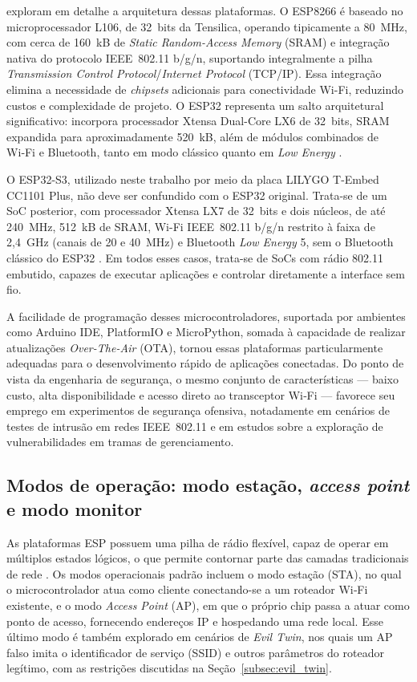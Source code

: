 exploram em detalhe a arquitetura dessas plataformas. O ESP8266 é baseado no microprocessador L106, de 32~bits da Tensilica, operando tipicamente a 80~MHz, com cerca de 160~kB de \textit{Static Random-Access Memory} (SRAM) e integração nativa do protocolo IEEE~802.11 b/g/n, suportando integralmente a pilha \textit{Transmission Control Protocol}/\textit{Internet Protocol} (TCP/IP). Essa integração elimina a necessidade de \textit{chipsets} adicionais para conectividade Wi-Fi, reduzindo custos e complexidade de projeto. O ESP32 representa um salto arquitetural significativo: incorpora processador Xtensa Dual-Core LX6 de 32~bits, SRAM expandida para aproximadamente 520~kB, além de módulos combinados de Wi‑Fi e Bluetooth, tanto em modo clássico quanto em \textit{Low Energy} \cite{LitayemAlsadi2023}.

O ESP32-S3, utilizado neste trabalho por meio da placa LILYGO T-Embed CC1101 Plus, não deve ser confundido com o ESP32 original. Trata-se de um SoC posterior, com processador Xtensa LX7 de 32~bits e dois núcleos, de até 240~MHz, 512~kB de SRAM, Wi-Fi IEEE~802.11 b/g/n restrito à faixa de 2,4~GHz (canais de 20 e 40~MHz) e Bluetooth \textit{Low Energy} 5, sem o Bluetooth clássico do ESP32 \cite{EspressifS3Datasheet}. Em todos esses casos, trata-se de SoCs com rádio 802.11 embutido, capazes de executar aplicações e controlar diretamente a interface sem fio.

A facilidade de programação desses microcontroladores, suportada por ambientes como Arduino IDE, PlatformIO e MicroPython, somada à capacidade de realizar atualizações \textit{Over-The-Air} (OTA), tornou essas plataformas particularmente adequadas para o desenvolvimento rápido de aplicações conectadas. Do ponto de vista da engenharia de segurança, o mesmo conjunto de características — baixo custo, alta disponibilidade e acesso direto ao transceptor Wi‑Fi — favorece seu emprego em experimentos de segurança ofensiva, notadamente em cenários de testes de intrusão em redes IEEE~802.11 e em estudos sobre a exploração de vulnerabilidades em tramas de gerenciamento.

\subsection{Modos de operação: modo estação, \textit{access point} e modo monitor}

As plataformas ESP possuem uma pilha de rádio flexível, capaz de operar em múltiplos estados lógicos, o que permite contornar parte das camadas tradicionais de rede \cite{LitayemAlsadi2023}. Os modos operacionais padrão incluem o modo estação (STA), no qual o microcontrolador atua como cliente conectando-se a um roteador Wi‑Fi existente, e o modo \textit{Access Point} (AP), em que o próprio chip passa a atuar como ponto de acesso, fornecendo endereços IP e hospedando uma rede local. Esse último modo é também explorado em cenários de \textit{Evil Twin}, nos quais um AP falso imita o identificador de serviço (SSID) e outros parâmetros do roteador legítimo, com as restrições discutidas na Seção~\ref{subsec:evil_twin}.

